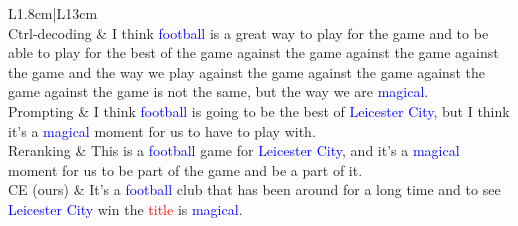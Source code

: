 \documentclass[11pt]{article}
\begin{document}
\begin{table}[htb!]
\begin{tabular}{L{1.8cm}|L{13cm}}
		\hline
		 \\
		\Xhline{1pt}
		Ctrl-decoding & I think \textcolor{blue}{football} is a great way to play for the game and to be able to play for the best of the game against the game against the game against the game and the way we play against the game against the game against the game against the game is not the same, but the way we are \textcolor{blue}{magical}. \\
		\hline
		Prompting  & I think \textcolor{blue}{football} is going to be the best of \textcolor{blue}{Leicester} \textcolor{blue}{City}, but I think it's a \textcolor{blue}{magical} moment for us to have to play with. \\
		\hline
		Reranking & This is a \textcolor{blue}{football} game for \textcolor{blue}{Leicester} \textcolor{blue}{City}, and it's a \textcolor{blue}{magical} moment for us to be part of the game and be a part of it. \\
		\Xhline{1pt}
		CE (ours) & It's a \textcolor{blue}{football} club that has been around for a long time and to see \textcolor{blue}{Leicester} \textcolor{blue}{City} win the \textcolor{red}{title} is \textcolor{blue}{magical}. \\
		\Xhline{1pt}
	\end{tabular}
	\caption{ Generated examples from the English dataset.}
	\label{tabel8}
\end{table}
\end{document}
